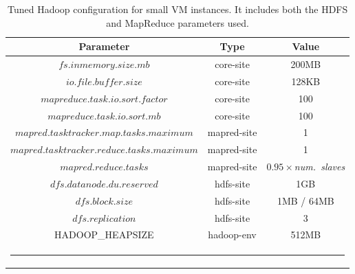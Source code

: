 \begin{table}[h!]
\caption{Tuned Hadoop configuration for small VM instances. It includes both the HDFS and MapReduce parameters used.}
\label{table:conf}
%
\vspace{-0.5em}
%
\begin{center}
\begin{tabular}{ccc}
\toprule
Parameter				& Type 			& Value	 	\\
\midrule
$fs.inmemory.size.mb$			& core-site		& 200MB	 	\\
$io.file.buffer.size$                  	& core-site		& 128KB  	\\
$mapreduce.task.io.sort.factor$ 	& core-site		& 100	 	\\
$mapreduce.task.io.sort.mb$ 	 	& core-site		& 100	 	\\
$mapred.tasktracker.map.tasks.maximum$ 	& mapred-site		& 1	 	\\
$mapred.tasktracker.reduce.tasks.maximum$ & mapred-site		& 1	 	\\
$mapred.reduce.tasks$ 			& mapred-site		& $0.95\times$\emph{num.~slaves} \\
$dfs.datanode.du.reserved$ 		& hdfs-site		& 1GB	 	\\
$dfs.block.size$ 			& hdfs-site		& 1MB / 64MB 	\\
$dfs.replication$ 			& hdfs-site		& 3	 	\\
HADOOP\_HEAPSIZE            	 	& hadoop-env   		& 512MB 	\\
%
%
\bottomrule
\multicolumn{3}{c}{\rule{0.98\textwidth}{0em}}\\
\end{tabular}
\end{center}
\end{table}


